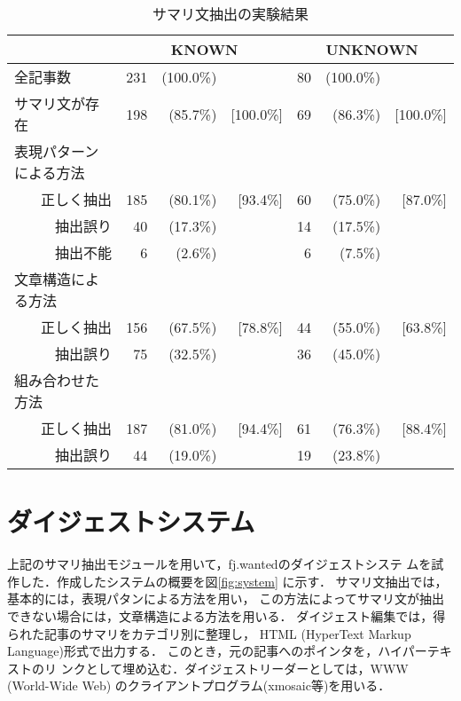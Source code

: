 \begin{table}
\caption{サマリ文抽出の実験結果}
\label{table:summary_result}
\begin{center}
\begin{tabular}{|l|rrr|rrr|} \hline
                   & \multicolumn{3}{c|}{KNOWN} & \multicolumn{3}{c|}{UNKNOWN} \\ \hline
全記事数           & 231 & (100.0\%) &          & 80 & (100.0\%) & \\ 
サマリ文が存在     & 198 & (85.7\%) & [100.0\%] & 69 & (86.3\%) & [100.0\%] \\ \hline
表現パターンによる方法 & \multicolumn{3}{c|}{} & \multicolumn{3}{c|}{} \\
\multicolumn{1}{|r|}{正しく抽出}
                   & 185 & (80.1\%) & [93.4\%]& 60 & (75.0\%) & [87.0\%] \\ 
\multicolumn{1}{|r|}{抽出誤り}
                   &  40 & (17.3\%) &         & 14 & (17.5\%) & \\
\multicolumn{1}{|r|}{抽出不能}
                   &   6 & (2.6\%)  &         &  6 & (7.5\%) & \\ \hline
文章構造による方法 & \multicolumn{3}{c|}{} & \multicolumn{3}{c|}{} \\
\multicolumn{1}{|r|}{正しく抽出} 
                   & 156 & (67.5\%) & [78.8\%]& 44 & (55.0\%) & [63.8\%] \\ 
\multicolumn{1}{|r|}{抽出誤り}
                   &  75 & (32.5\%) &         & 36 & (45.0\%) & \\ \hline
組み合わせた方法 & \multicolumn{3}{c|}{} & \multicolumn{3}{c|}{} \\
\multicolumn{1}{|r|}{正しく抽出}
                   & 187 & (81.0\%) & [94.4\%]& 61 & (76.3\%) & [88.4\%] \\ 
\multicolumn{1}{|r|}{抽出誤り}
                   &  44 & (19.0\%) &         & 19 & (23.8\%) & \\ \hline
\end{tabular}
\end{center}
\end{table}


\section{ダイジェストシステム}

上記のサマリ抽出モジュールを用いて，fj.wantedのダイジェストシステ
ムを試作した．作成したシステムの概要を図\ref{fig:system} に示す．
サマリ文抽出では，基本的には，表現パタンによる方法を用い，
この方法によってサマリ文が抽出できない場合には，文章構造による方法を用いる．
ダイジェスト編集では，得られた記事のサマリをカテゴリ別に整理し，
HTML (HyperText Markup Language)形式で出力する．
このとき，元の記事へのポインタを，ハイパーテキストのリ
ンクとして埋め込む．ダイジェストリーダーとしては，WWW (World-Wide Web)
のクライアントプログラム(xmosaic等)を用いる．

